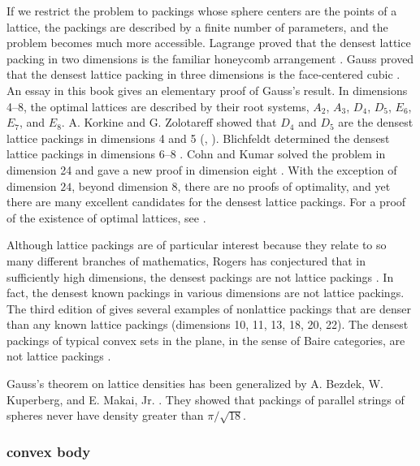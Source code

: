If we restrict the problem
to packings whose sphere centers are the points of a lattice, the
 packings are described by a finite number of parameters, and the
problem becomes much more accessible.  Lagrange proved that the
densest lattice packing in two dimensions is the familiar honeycomb
arrangement \cite{Lag73}. Gauss proved that the densest lattice
packing in three dimensions is the face-centered cubic \cite{Gau31}.
An essay in this book gives an elementary proof of Gauss's result.
In dimensions 4--8, the optimal lattices are described by their root
systems, $A_2$, $A_3$, $D_4$, $D_5$, $E_6$, $E_7$, and $E_8$. A.
Korkine and G. Zolotareff showed that $D_4$ and $D_5$ are the
densest lattice packings in dimensions 4 and 5 (\cite{KoZ73},
\cite{KoZ77}). Blichfeldt determined the densest lattice packings in
dimensions 6--8 \cite{Bli35}. 
Cohn and Kumar solved the problem in
dimension 24 and gave a new proof in dimension eight \cite{CoKu}.  
With the exception of dimension $24$,
beyond dimension $8$, there are no proofs of optimality, and yet
there are many excellent candidates for the densest lattice
packings.  For a proof of the existence of optimal lattices, see
\cite{Oes90}.


Although lattice packings are of particular interest because they
relate to so many different branches of mathematics, Rogers has
conjectured that in sufficiently high dimensions, the densest
packings are not lattice packings \cite{Rog64}.   In fact, the
densest known packings in various dimensions are not lattice
packings.  The third edition of \cite{CS} gives several examples
of nonlattice packings that are denser than any known lattice
packings (dimensions 10, 11, 13, 18, 20, 22). The densest packings
of typical convex sets in the plane, in the sense of Baire
categories, are not lattice packings \cite{Fej95}.

Gauss's theorem on lattice densities has been generalized by
A. Bezdek, W. Kuperberg, and E. Makai, Jr. \cite{BKM91}.
They showed that packings of parallel
strings of spheres never have density greater than $\pi/\sqrt{18}$.

\subsubsection{convex body}

